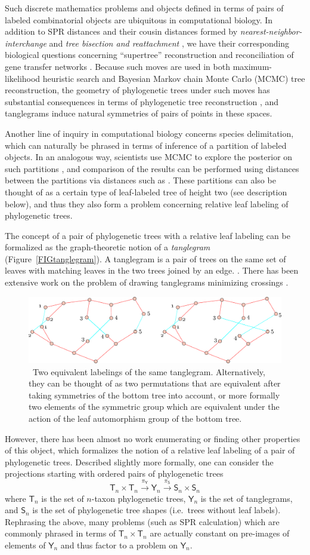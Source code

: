 \documentclass{amsart}
\newcommand{\tree}{\mathsf{T}}
\newcommand{\shape}{\mathsf{S}}
\newcommand{\tangle}{\mathsf{Y}}
\newcommand{\arxiv}[1]{#1}
\newcommand{\FIGtanglegram}{\
\label{FIGtanglegram}
\begin{figure}
  \arxiv{\includegraphics[width=5in]{figures/alternate-labeling}}
\caption{\
  Two equivalent labelings of the same tanglegram.
  Alternatively, they can be thought of as two permutations that are equivalent after taking symmetries of the bottom tree into account, or more formally two elements of the symmetric group which are equivalent under the action of the leaf automorphism group of the bottom tree.
}
\end{figure}
}
\begin{document}
Such discrete mathematics problems and objects defined in terms of pairs of labeled combinatorial objects are ubiquitous in computational biology.
In addition to SPR distances and their cousin distances formed by \emph{nearest-neighbor-interchange} and \emph{tree bisection and reattachment} \cite{wiki:treeRearrangement}, we have their corresponding biological questions concerning ``supertree'' reconstruction \cite{Whidden2014-ku} and reconciliation of gene transfer networks \cite{Boon2013-mc}.
Because such moves are used in both maximum-likelihood heuristic search and Bayesian Markov chain Monte Carlo (MCMC) tree reconstruction, the geometry of phylogenetic trees under such moves has substantial consequences in terms of phylogenetic tree reconstruction \cite{Whidden2014-yt}, and tanglegrams induce natural symmetries of pairs of points in these spaces.

Another line of inquiry in computational biology concerns species delimitation, which can naturally be phrased in terms of inference of a partition of labeled objects.
In an analogous way, scientists use MCMC to explore the posterior on such partitions \cite{Yang2010-kc}, and comparison of the results can be performed using distances between the partitions via distances such as \cite{Gusfield2002-il}.
These partitions can also be thought of as a certain type of leaf-labeled tree of height two (see description below), and thus they also form a problem concerning relative leaf labeling of phylogenetic trees.

The concept of a pair of phylogenetic trees with a relative leaf labeling can be formalized as the graph-theoretic notion of a \emph{tanglegram} (Figure~\ref{FIGtanglegram}).
A tanglegram is a pair of trees on the same set of leaves with matching leaves in the two trees joined by an edge. \cite{Venkatachalam2010-zh}.
There has been extensive work on the problem of drawing tanglegrams minimizing crossings \cite{Buchin2008-lc,Lozano2008-tp,Bansal2009-ni,Bocker2009-xl,Fernau2010-an,Venkatachalam2010-zh}.
\FIGtanglegram

However, there has been almost no work enumerating or finding other properties of this object, which formalizes the notion of a relative leaf labeling of a pair of phylogenetic trees.
Described slightly more formally, one can consider the projections starting with ordered pairs of phylogenetic trees
\begin{equation}
\label{eq:projChain}
\tree_n \times \tree_n \xrightarrow{\pi_\tangle} \tangle_n \xrightarrow{\pi_\shape} \shape_n \times \shape_n
\end{equation}
where $\tree_n$ is the set of $n$-taxon phylogenetic trees, $\tangle_n$ is the set of tanglegrams, and $\shape_n$ is the set of phylogenetic tree shapes (i.e.\ trees without leaf labels).
Rephrasing the above, many problems (such as SPR calculation) which are commonly phrased in terms of $\tree_n \times \tree_n$ are actually constant on pre-images of elements of $\tangle_n$ and thus factor to a problem on $\tangle_n$.
\end{document}
